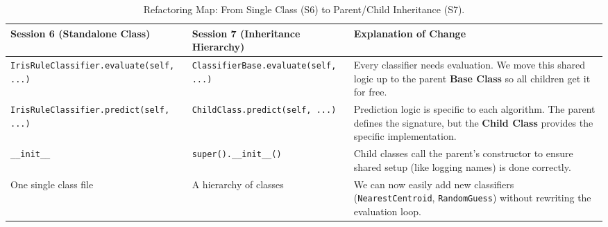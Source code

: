 \begin{landscape}
\begin{table}[H]
\centering
\small
\renewcommand{\arraystretch}{0.3}

\begin{tabular}{|p{}|p{}|p{}|}
\hline
\textbf{Session 6 (Standalone Class)} & \textbf{Session 7 (Inheritance Hierarchy)} & \textbf{Explanation of Change} \\
\hline
\texttt{IrisRuleClassifier.evaluate(self, ...)} & \texttt{ClassifierBase.evaluate(self, ...)} & Every classifier needs evaluation. We move this shared logic up to the parent \textbf{Base Class} so all children get it for free. \\
\hline
\texttt{IrisRuleClassifier.predict(self, ...)} & \texttt{ChildClass.predict(self, ...)} & Prediction logic is specific to each algorithm. The parent defines the signature, but the \textbf{Child Class} provides the specific implementation. \\
\hline
\texttt{\_\_init\_\_} & \texttt{super().\_\_init\_\_()} & Child classes call the parent's constructor to ensure shared setup (like logging names) is done correctly. \\
\hline
One single class file & A hierarchy of classes & We can now easily add new classifiers (\texttt{NearestCentroid}, \texttt{RandomGuess}) without rewriting the evaluation loop. \\
\hline
\end{tabular}
\caption{Refactoring Map: From Single Class (S6) to Parent/Child Inheritance (S7).}
\end{table}
\end{landscape}
